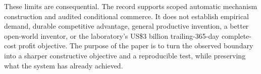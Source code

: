 These limits are consequential. The record supports scoped automatic mechanism construction and audited conditional commerce. It does not establish empirical demand, durable competitive advantage, general productive invention, a better open-world inventor, or the laboratory's US\$3 billion trailing-365-day complete-cost profit objective. The purpose of the paper is to turn the observed boundary into a sharper constructive objective and a reproducible test, while preserving what the system has already achieved.
